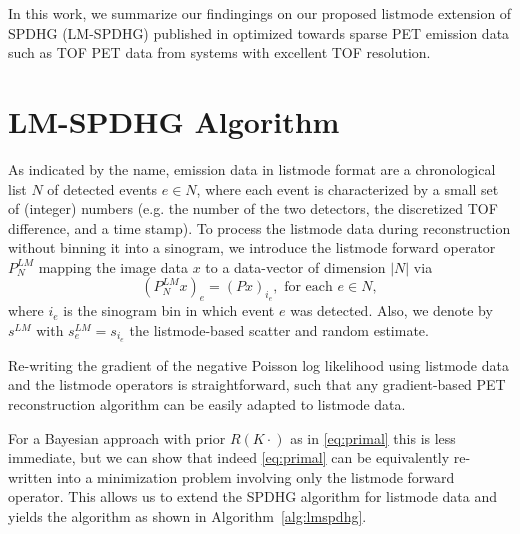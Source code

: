 In this work, we summarize our findingings on our proposed listmode extension of SPDHG (LM-SPDHG)
published in \cite{Schramm2022} optimized towards sparse PET emission data such as TOF PET data
from systems with excellent TOF resolution.

\section{LM-SPDHG Algorithm}

As indicated by the name, emission data in listmode format are a chronological list $N$ of detected 
events $e \in N$, where each event is characterized by a small set of (integer) numbers 
(e.g. the number of the two detectors, the discretized TOF difference, and a time stamp).
To process the listmode data during reconstruction without binning it into a sinogram,
we introduce the listmode forward operator $P^{LM}_N$ mapping the image data $x$ to a 
data-vector of dimension $|N|$ via 
%
\begin{equation}
(P^{LM}_N x)_e  = (Px)_{i_e} , \text{ for each }e \in N,
\label{eq:lmop}
\end{equation}
%
where $i_e$ is the sinogram bin in which event $e$ was detected. 
Also, we denote by $s^{LM}$ with $s^{LM}_e = s_{i_e}$ the listmode-based scatter 
and random estimate.

Re-writing the gradient of the negative Poisson log likelihood using listmode data and the
listmode operators is straightforward, such that any gradient-based PET reconstruction algorithm 
can be easily adapted to listmode data.

For a Bayesian approach with prior $R(K \cdot)$ as in \eqref{eq:primal} this is less immediate, 
but we can show that indeed \eqref{eq:primal} can be equivalently re-written into 
a minimization problem involving only the listmode forward operator. 
This allows us to extend the SPDHG algorithm for listmode data and yields the algorithm as shown 
in Algorithm~\ref{alg:lmspdhg}.


